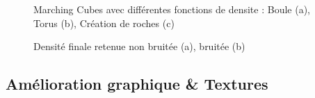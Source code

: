 \documentclass[a4paper]{article}
\begin{document}
\begin{figure}[H]
\centering
{}
\caption{Marching Cubes avec différentes fonctions de densite : Boule (a), Torus (b), Création de roches (c)}
\end{figure}
\begin{figure}[H]
\centering
{}
\caption{Densité finale retenue non bruitée (a), bruitée (b)}
\end{figure}

\subsection{Amélioration graphique \& Textures}
\end{document}
